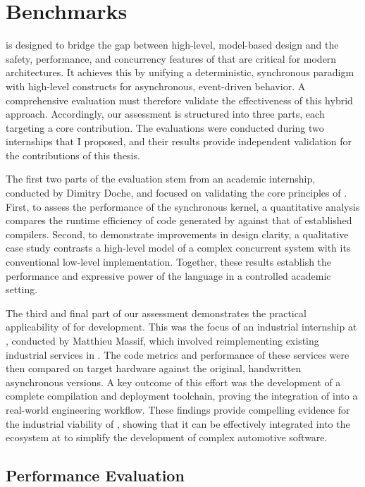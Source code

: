 \section{Benchmarks}
\label{sec:grust:benchmarks}

\GRust is designed to bridge the gap between high-level, model-based design and the safety,
performance, and concurrency features of \Rust that are critical for modern \sdv architectures.
It achieves this by unifying a deterministic, synchronous paradigm with high-level constructs for
asynchronous, event-driven behavior. A comprehensive evaluation must therefore validate the
effectiveness of this hybrid approach. Accordingly, our assessment is structured into three parts,
each targeting a core contribution. The evaluations were conducted during two internships that I
proposed, and their results provide independent validation for the contributions of this thesis.

The first two parts of the evaluation stem from an academic internship, conducted by Dimitry Doche,
and focused on validating the core principles of \GRust.
%
First, to assess the performance of the synchronous kernel, a quantitative analysis compares the
runtime efficiency of code generated by \GRust against that of established \Lustre compilers.
%
Second, to demonstrate improvements in design clarity, a qualitative case study contrasts a
high-level \GRust model of a complex concurrent system with its conventional low-level \Ci
implementation. Together, these results establish the performance and expressive power of the
language in a controlled academic setting.

The third and final part of our assessment demonstrates the practical applicability of \GRust for
\sdv development. This was the focus of an industrial internship at \ampere, conducted by Matthieu
Massif, which involved reimplementing existing industrial services in \GRust. The code metrics and
performance of these services were then compared on target hardware against the original,
handwritten asynchronous \Rust versions. A key outcome of this effort was the development of a
complete compilation and deployment toolchain, proving the integration of \GRust into a real-world
engineering workflow. These findings provide compelling evidence for the industrial viability of
\GRust, showing that it can be effectively integrated into the \Rust ecosystem at \ampere to
simplify the development of complex automotive software.

\subsection{\GRSync Performance Evaluation}
\label{sec:grust:benchmarks:compare_grsync}

